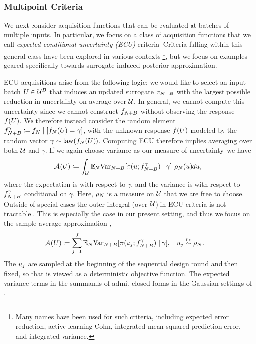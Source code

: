 \documentclass[12pt]{article}
\begin{document}
\subsubsection{Multipoint Criteria}
We next consider acquisition functions that can be evaluated at batches of multiple inputs. In particular,
we focus on a class of acquisition functions that we call \textit{expected conditional uncertainty (ECU)} 
criteria. Criteria falling within this general class have been explored in various contexts 
\citep{ALC,Roy2001,Mercer_kernels_IVAR,Binois_2018,deepGPAL,ALExpErrReduction,parallelSURExcursionSet}
\footnote{Many names have been used for such criteria, including expected error reduction, 
active learning Cohn, integrated mean squared prediction error, and integrated variance.},
but we focus on examples geared specifically towards surrogate-induced posterior approximation.

ECU acquisitions arise from the following logic: we would like to select an input batch 
$\parMat \in \parSpace^{\Nbatch}$ that induces an updated surrogate $\postEm[\Naugment]$ with the largest 
possible reduction in uncertainty on average over $\parSpace$. In general, we cannot compute this uncertainty
since we cannot construct $\funcEm[\Naugment]$ without observing the response $\func(\parMat)$. We therefore
instead consider the random element 
$\funcEm[\Naugment]^{\gamma} \Def \funcEm[\Ndesign] \given [\funcEm[\Ndesign](\parMat) = \gamma]$, with 
the unknown response $\func(\parMat)$ modeled by the random vector 
$\gamma \sim \mathrm{law}(\funcEm[\Ndesign](\parMat))$. Computing ECU therefore implies averaging over 
both $\parSpace$ and $\gamma$. If we again choose variance as our measure of uncertainty, we have
\begin{equation}
\acq[](\parMat) \Def 
\int_{\parSpace} \E_{\Ndesign} \Var_{\Naugment}[\postDens(\Par; \funcEm[\Naugment]^{\gamma}) \given \gamma] \ \weightDens(\Par) d\Par,
 \label{eq:acq-intvar}
\end{equation}
where the expectation is with respect to $\gamma$, and the variance is with respect to $\funcEm[\Naugment]^{\gamma}$
conditional on $\gamma$. Here, $\weightDens$ is a measure on $\parSpace$ that we are free to choose.
Outside of special cases the outer integral (over $\parSpace$) in ECU criteria is not 
tractable \citep{Binois_2018,MakTargetedVar,Koermer2024}. This is especially the case in our present setting,
and thus we focus on the sample average approximation \citep{Mercer_kernels_IVAR},
\begin{align}
&\acq[](\parMat) \Def 
\sum_{j=1}^{J} \E_{\Ndesign} \Var_{\Naugment}[\postDens(\Par_j; \funcEm[\Naugment]^{\gamma}) \given \gamma],
&&\Par_j \overset{\mathrm{iid}}{\sim} \weightDens[\Ndesign].
 \label{eq:acq-intvar-saa}
\end{align}
The $\Par_j$ are sampled at the beginning of the sequential design round and then fixed, so that
 is viewed as a deterministic objective function. The expected variance 
terms in the summands of  admit closed forms in the Gaussian 
settings of .
\end{document}
